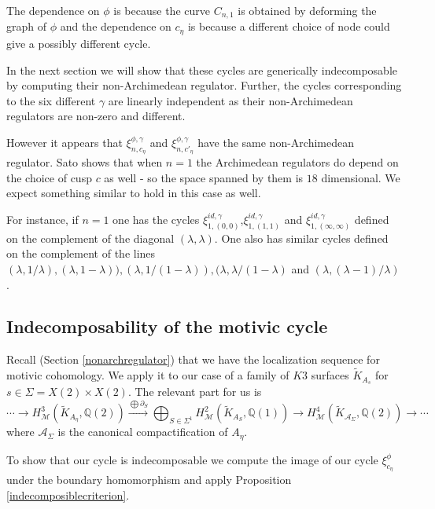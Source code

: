 \documentclass[11pt,a4paper]{article}
\newcommand {\A}{{\mathcal A}}
\newcommand {\Q}{{\mathds Q}}
\newcommand {\M}{{\mathcal M}}
\newcommand {\TK}{{\tilde{K}}}
\newcommand {\lb}{{\lambda}}
\begin{document}
 The dependence on $\phi$ is because the curve $C_{n,1}$ is obtained by deforming the graph of $\phi$ and the dependence on $c_{\eta}$ is because a different choice of node could give a possibly different cycle. 

In the next section we will show that these cycles are generically indecomposable by computing their non-Archimedean regulator. Further, the cycles corresponding to the six different $\gamma$ are linearly independent as their non-Archimedean regulators are non-zero and different. 

However it appears that $\xi_{n,c_{\eta}}^{\phi,\gamma}$ and $\xi_{n,c'_{\eta}}^{\phi,\gamma}$ have the same non-Archimedean regulator. Sato \cite{sato} shows that when $n=1$ the Archimedean regulators do depend on the choice of cusp $c$ as well - so the space spanned by them is $18$ dimensional. We expect something similar to hold in this case as well.  

For instance, if $n=1$ one has the cycles $\xi^{id,\gamma}_{1,(0,0)}$,$\xi^{id,\gamma}_{1,(1,1)}$ and $\xi^{id,\gamma}_{1,(\infty,\infty)}$ defined on the complement of the diagonal $(\lb,\lb)$. One also has similar  cycles defined on the complement of the lines $(\lb,1/\lb), (\lb,1-\lb)), (\lb,1/(1-\lb)),(\lb,\lb/(1-\lb)$ and $(\lb,(\lb-1)/\lb)$.





\subsection{Indecomposability of the motivic cycle}

\label{indecomposabilityofthecycle}


Recall (Section \ref{nonarchregulator}) that we have the localization sequence for motivic cohomology. We apply it to our case of a family of 
$K3$ surfaces $\TK_{A_s}$ for $s \in \Sigma=X(2) \times X(2)$. The relevant part for us is  
%
$$ \cdots \rightarrow H^3_{\M}(\TK_{A_{\eta}},\Q(2)) \stackrel{\bigoplus \partial_S}{\longrightarrow} \bigoplus_{S\in \Sigma^1} H^2_{\M}(\TK_{A_S},\Q(1)) \rightarrow H^{4}_{\M}(\TK_{\A_{\Sigma}},\Q(2))\rightarrow \cdots$$
%
where $\A_{\Sigma}$ is the canonical compactification of $A_{\eta}$. 

To show that our cycle is indecomposable we compute the image of our  cycle $\xi^{\phi}_{c_\eta}$ under the boundary homomorphism and apply Proposition \ref{indecomposiblecriterion}. 
\end{document}
